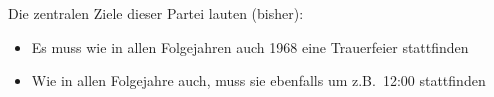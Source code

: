 Die zentralen Ziele dieser Partei lauten (bisher):
\begin{itemize}
  \item Es muss wie in allen Folgejahren auch 1968 eine Trauerfeier stattfinden
  \item Wie in allen Folgejahre auch, muss sie ebenfalls um z.B.~12:00 stattfinden
\end{itemize}
